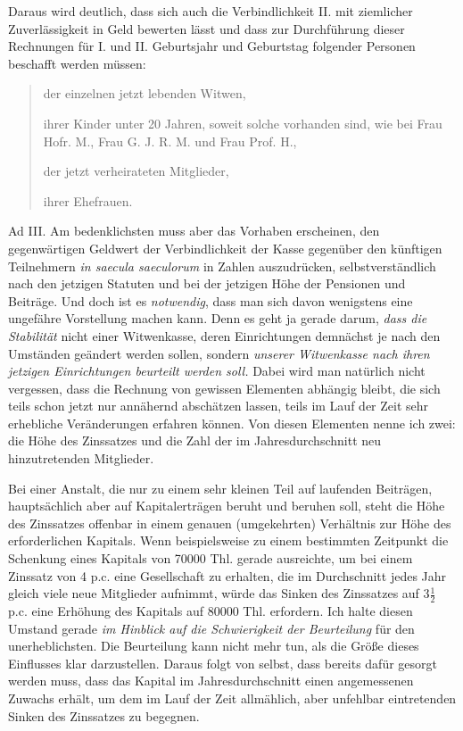 \par{}
Daraus wird deutlich, dass sich auch die Verbindlichkeit II. mit ziemlicher Zuverlässigkeit in Geld bewerten lässt und dass zur Durchführung dieser Rechnungen für I. und II. Geburtsjahr und Geburtstag folgender Personen beschafft werden müssen:
\begin{quote}
der einzelnen jetzt lebenden Witwen,\par
ihrer Kinder unter 20 Jahren, soweit solche vorhanden sind, wie bei Frau Hofr. M., Frau G. J. R. M. und Frau Prof. H.,\par
der jetzt verheirateten Mitglieder,\par
ihrer Ehefrauen.
\end{quote}
\noindent\hspace*{\parindent}Ad III. Am bedenklichsten muss aber das Vorhaben erscheinen, den gegenwärtigen Geldwert der Verbindlichkeit der Kasse gegenüber den künftigen Teilnehmern \textit{in saecula saeculorum} in Zahlen auszudrücken, selbstverständlich nach den jetzigen Statuten und bei der jetzigen Höhe der Pensionen und Beiträge. Und doch ist es \textit{notwendig}, dass man sich davon wenigstens eine ungefähre Vorstellung machen kann. Denn es geht ja gerade darum, \textit{dass die Stabilität} nicht einer Witwenkasse, deren Einrichtungen demnächst je nach den Umständen geändert werden sollen, sondern \textit{unserer Witwenkasse nach ihren jetzigen Einrichtungen beurteilt werden soll.} Dabei wird man natürlich nicht vergessen, dass die Rechnung von gewissen Elementen abhängig bleibt, die sich teils schon jetzt nur annähernd abschätzen lassen, teils im Lauf der Zeit sehr erhebliche Veränderungen erfahren können. Von diesen Elementen nenne ich zwei: die Höhe des Zinssatzes und die Zahl der im Jahresdurchschnitt neu hinzutretenden Mitglieder.

Bei einer Anstalt, die nur zu einem sehr kleinen Teil auf laufenden Beiträgen, hauptsächlich aber auf Kapitalerträgen beruht und beruhen soll, steht die Höhe des Zinssatzes offenbar in einem genauen (umgekehrten) Verhältnis zur Höhe des erforderlichen Kapitals. Wenn beispielsweise zu einem bestimmten Zeitpunkt die Schenkung eines Kapitals von 70000 Thl. gerade ausreichte, um bei einem Zinssatz von 4 p.c. eine Gesellschaft zu erhalten, die im Durchschnitt jedes Jahr gleich viele neue Mitglieder aufnimmt, würde das Sinken des Zinssatzes auf \(3\frac12\) p.c. eine Erhöhung des Kapitals auf 80000 Thl. erfordern. Ich halte diesen Umstand gerade \textit{im Hinblick auf die Schwierigkeit der Beurteilung} für den unerheblichsten. Die Beurteilung kann nicht mehr tun, als die Größe dieses Einflusses klar darzustellen. Daraus folgt von selbst, dass bereits dafür gesorgt werden muss, dass das Kapital im Jahresdurchschnitt einen angemessenen Zuwachs erhält, um dem im Lauf der Zeit allmählich, aber unfehlbar eintretenden Sinken des Zinssatzes zu begegnen.

